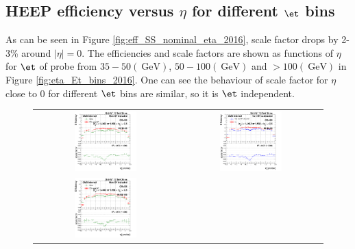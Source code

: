 \subsection{HEEP efficiency versus \texorpdfstring{$\eta$}{h1} for different \texorpdfstring{$\et$}{h2} bins}
\label{AppHEEPsf_eta_Et_bins_2016}
As can be seen in Figure \ref{fig:eff_SS_nominal_eta_2016}, scale factor drops by 2-3\% around $|\eta|=0$.
The efficiencies and scale factors are shown as functions of $\eta$ for $\et$ of probe from $35-50 (~\mathrm{GeV})$, $50-100 (~\mathrm{GeV})$ and $>100 (~\mathrm{GeV})$ in Figure \ref{fig:eta_Et_bins_2016}. One can see the behaviour of scale factor for $\eta$ close to 0 for different $\et$ bins are similar, so it is $\et$ independent.
\begin{figure}[bh]
  \begin{center}
    \begin{tabular}{cc}
      \includegraphics[width=0.45\textwidth]{figures/Zprime/2016/ScaleFactor/SameSign/eta_Et_bins/g_compare_cut_eta_Barrel+Endcap_ea_ta_inc_AS_ProbeEt_35_50_PUW.png} &
      \includegraphics[width=0.45\textwidth]{figures/Zprime/2016/ScaleFactor/SameSign/eta_Et_bins/g_compare_cut_eta_Barrel+Endcap_ea_ta_exc_AS_ProbeEt_35_50_PUW.png} \\
      \includegraphics[width=0.45\textwidth]{figures/Zprime/2016/ScaleFactor/SameSign/eta_Et_bins/g_compare_cut_eta_Barrel+Endcap_ea_ta_inc_AS_ProbeEt_50_100_PUW.png} &

\end{tabular}
\end{center}
\end{figure}
